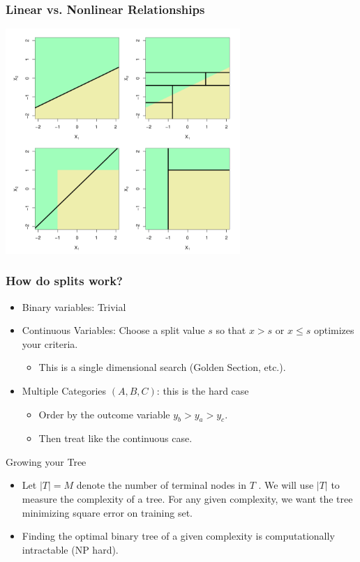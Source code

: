\documentclass[xcolor=pdftex,dvipsnames,table,mathserif]{beamer}
\begin{document}
\begin{frame}
\frametitle{Linear vs. Nonlinear Relationships}
\includegraphics[width=3.5in]{./resources/treefit.png}
\end{frame}


\begin{frame}
\frametitle{How do splits work?}
\begin{itemize}
\item Binary variables: Trivial
\item Continuous Variables: Choose a split value $s$ so that $x>s$ or $x\leq s$ optimizes your criteria.
\begin{itemize}
\item This is a single dimensional search (Golden Section, etc.).
\end{itemize}
\item Multiple Categories $(A,B,C)$: this is the hard case
\begin{itemize}
\item Order by the outcome variable $y_b > y_a > y_c$.
\item Then treat like the continuous case.
\end{itemize}
\end{itemize}
\end{frame}

\begin{frame}{Growing your Tree}
\begin{itemize}
\item Let $|T| = M$ denote the number of terminal nodes in $T$ . We will use $|T|$ to measure the complexity of a tree. For any given complexity,
we want the tree minimizing square error on training set.
\item Finding the optimal binary tree of a given complexity is computationally intractable (NP hard).
\end{itemize}
\end{frame}
\end{document}
